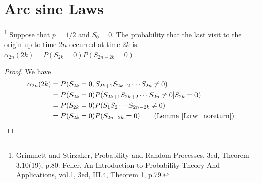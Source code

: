 \section{Arc sine Laws}

\begin{theorem}
\footnote{Grimmett and Stirzaker, Probability and Random Processes, 3ed, 
  Theorem 3.10(19), p.80. Feller, An Introduction to Probability Theory And 
  Applications, vol.1, 3ed, III.4, Theorem 1, p.79.}
Suppose that $p=1/2$ and $S_0=0$. The probability that the last visit to the
origin up to time $2n$ occurred at time $2k$ is 
$\alpha_{2n}(2k)=P(S_{2k}=0) P(S_{2n-2k}=0)$.
\end{theorem}
\begin{proof}
We have
\begin{align*}
  \alpha_{2n}(2k) 
    &= P(S_{2k}=0, S_{2k+1}S_{2k+2}\cdots S_{2n}\neq 0)  \\
    &= P(S_{2k}=0) P(S_{2k+1}S_{2k+2}\cdots S_{2n}\neq 0 | S_{2k}=0 )   \\
    &= P(S_{2k}=0) P(S_1 S_2 \cdots S_{2n-2k}\neq 0)   \\
    &= P(S_{2k}=0) P(S_{2n-2k}= 0)   \qquad \text{(Lemma \ref{L:rw_noreturn})}
\end{align*}
\end{proof}


